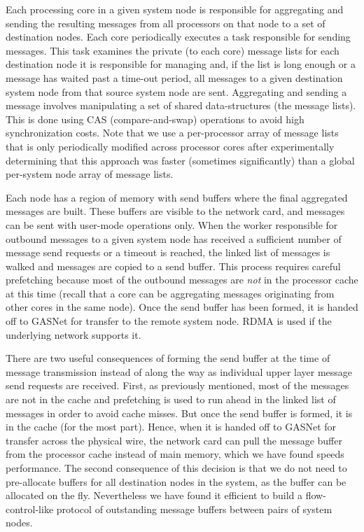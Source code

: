 Each processing core in a given system node is responsible for
aggregating and sending the resulting messages from all processors on
that node to a set of destination nodes.  Each core periodically
executes a task responsible for sending messages.  This task examines
the private (to each core) message lists for each destination node it
is responsible for managing and, if the list is long enough or a
message has waited past a time-out period, all messages to a given
destination system node from that source system node are sent.
Aggregating and sending a message involves manipulating a set of
shared data-structures (the message lists). This is done using CAS
(compare-and-swap) operations to avoid high synchronization costs.
Note that we use a per-processor array of message lists
that is only periodically modified across processor cores after
experimentally determining that this approach was faster (sometimes
significantly) than a global per-system node array of message lists.

Each node has a region of memory with send buffers where the final aggregated
messages are built. These buffers are visible to the network card, and
messages can be sent with user-mode operations only. When the worker
responsible for outbound messages to a given system node has received a
sufficient number of message send requests or a timeout is reached, the
linked list of messages is walked and messages are copied to a send buffer.
This process requires careful prefetching because most of the outbound
messages are \emph{not\/} in the processor cache at this time (recall that a
core can be aggregating messages originating from other cores in the same
node). Once the send buffer has been formed, it is handed off to GASNet for
transfer to the remote system node. RDMA is used if the underlying network
supports it. 

There are two useful consequences of forming the send buffer at the time of
message transmission instead of along the way as individual upper layer
message send requests are received. First, as previously mentioned, most of the
messages are not in the cache and prefetching is used to run ahead in the
linked list of messages in order to avoid cache misses. But once the send
buffer is formed, it is in the cache (for the most part). Hence, when it is
handed off to GASNet for transfer across the physical wire, the network card
can pull the message buffer from the processor cache instead of main memory,
which we have found speeds performance. The second consequence of this
decision is that we do not need to pre-allocate buffers for all destination
nodes in the system, as the buffer can be allocated on the fly. Nevertheless
we have found it efficient to build a flow-control-like protocol of
outstanding message buffers between pairs of system nodes.

